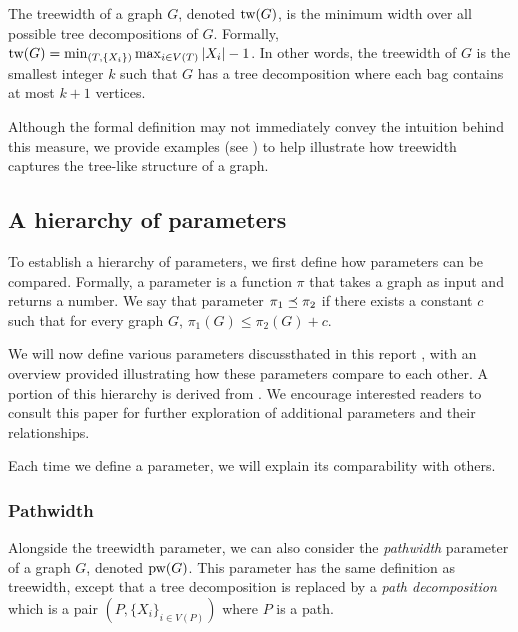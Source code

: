 \begin{definition}[treewidth]
    The treewidth of a graph $G$, denoted $\text{tw}(G)$, is the minimum width over all possible tree decompositions of $G$. Formally, $\text{tw}(G) = \min_{(T, \{X_i\})}\max_{i \in V(T)} |X_i| - 1$. In other words, the treewidth of $G$ is the smallest integer $k$ such that $G$ has a tree decomposition where each bag contains at most $k+1$ vertices.
\end{definition}

Although the formal definition may not immediately convey the intuition behind this measure, we provide examples (see ) to help illustrate how treewidth captures the tree-like structure of a graph.



\subsection{A hierarchy of parameters}

To establish a hierarchy of parameters, we first define how parameters can be compared. Formally, a parameter is a function $\pi$ that takes a graph as input and returns a number. We say that parameter $\pi_1 \preceq \pi_2$ if there exists a constant $c$ such that for every graph $G$, $\pi_1(G) \leq \pi_2(G) + c$.

We will now define various parameters discussthated in this report , with an overview provided  illustrating how these parameters compare to each other. A portion of this hierarchy is derived from \cite{fellows2013towards}. We encourage interested readers to consult this paper for further exploration of additional parameters and their relationships.

Each time we define a parameter, we will explain its comparability with others.



\subsubsection*{Pathwidth}

Alongside the treewidth parameter, we can also consider the \textit{pathwidth} parameter of a graph $G$, denoted $\text{pw}(G)$. This parameter has the same definition as treewidth, except that a tree decomposition is replaced by a \textit{path decomposition} which is a pair $(P, \{X_i\}_{i \in V(P)})$ where $P$ is a path.

